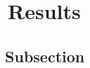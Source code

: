 \graphicspath{{images/}}

\section{\thesection~Results}
\label{sec:results}
\citep{palkova1997}

\subsection{\thesubsection~Subsection}

